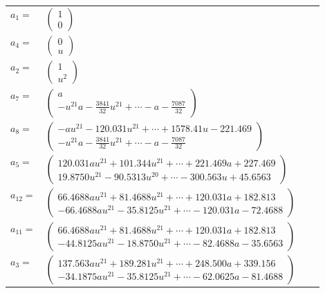 \documentclass[1p]{elsarticle_modified}
\theoremstyle{definition}
\begin{document}
\begin{tabular}{m{7pt} m{180pt} m{7pt} m{180pt} }
\flushright $a_{1}=$&$\begin{pmatrix}1\\0\end{pmatrix}$ \\
\flushright $a_{4}=$&$\begin{pmatrix}0\\u\end{pmatrix}$ \\
\flushright $a_{2}=$&$\begin{pmatrix}1\\u^2\end{pmatrix}$ \\
\flushright $a_{7}=$&$\begin{pmatrix}a\\- u^{21} a-\frac{3841}{32} u^{21}+\cdots- a-\frac{7087}{32}\end{pmatrix}$ \\
\flushright $a_{8}=$&$\begin{pmatrix}-a u^{21}-120.031 u^{21}+\cdots+1578.41 u-221.469\\- u^{21} a-\frac{3841}{32} u^{21}+\cdots- a-\frac{7087}{32}\end{pmatrix}$ \\
\flushright $a_{5}=$&$\begin{pmatrix}120.031 a u^{21}+101.344 u^{21}+\cdots+221.469 a+227.469\\19.8750 u^{21}-90.5313 u^{20}+\cdots-300.563 u+45.6563\end{pmatrix}$ \\
\flushright $a_{12}=$&$\begin{pmatrix}66.4688 a u^{21}+81.4688 u^{21}+\cdots+120.031 a+182.813\\-66.4688 a u^{21}-35.8125 u^{21}+\cdots-120.031 a-72.4688\end{pmatrix}$ \\
\flushright $a_{11}=$&$\begin{pmatrix}66.4688 a u^{21}+81.4688 u^{21}+\cdots+120.031 a+182.813\\-44.8125 a u^{21}-18.8750 u^{21}+\cdots-82.4688 a-35.6563\end{pmatrix}$ \\
\flushright $a_{3}=$&$\begin{pmatrix}137.563 a u^{21}+189.281 u^{21}+\cdots+248.500 a+339.156\\-34.1875 a u^{21}-35.8125 u^{21}+\cdots-62.0625 a-81.4688\end{pmatrix}$ \\

\end{tabular}
\end{document}
